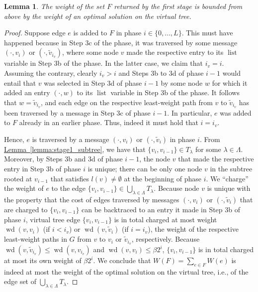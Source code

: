 \documentclass[letterpaper,11pt]{article}
\newtheorem{lemma}[theorem]{Lemma}
\newcommand{\namedref}[2]{\hyperref[#2]{#1~\ref*{#2}}}
\newcommand{\lemmaref}[1]{\namedref{Lemma}{#1}}
\newcommand{\Comp}{\lambda}
\DeclareMathOperator{\Wd}{wd}
\DeclareMathOperator{\unsent}{list}
\begin{document}
\begin{lemma}\label{lemma:stage1_approx}
The weight of the set $F$ returned by the first stage is bounded from above
by the weight of an optimal solution on the virtual tree.
\end{lemma}
\begin{proof}
Suppose edge $e$ is added to $F$ in phase $i\in \{0,\ldots,L\}$.
This must have happened because in Step 3c of the phase, it was traversed by
some message $(\cdot,v_i)$ or $(\cdot,\tilde{v}_{i_v})$, where some node $v$
made the respective entry to its $\unsent$ variable in Step 3b of the phase. In
the latter case, we claim that $i_v=i$. Assuming the contrary, clearly $i_v>i$
and Steps 3b to 3d of phase $i-1$ would entail that $v$ was selected in Step 3d
of phase $i-1$ by some node $w$ for which it added an entry $(\cdot,w)$ to its
$\unsent$ variable in Step 3b of the phase. It follows that $w=\tilde{v}_{i_v}$,
and each edge on the respective least-weight path from $v$ to $\tilde{v}_{i_v}$
has been traversed by a message in Step 3c of phase $i-1$. In particular, $e$
was added to $F$ already in an earlier phase. Thus, indeed it must hold that
$i=i_v$.

Hence, $e$ is traversed by a message $(\cdot,v_i)$ or $(\cdot,\tilde{v}_i)$
in phase $i$. From \lemmaref{lemma:stage1_subtree}, we have that
$\{v_i,v_{i-1}\}\in T_{\Comp}$ for some $\Comp\in \Lambda$. Moreover, by Steps
3b and 3d of phase $i-1$, the node $v$ that made the respective entry in Step 3b
of phase $i$ is unique; there can be only one node $v$ in the subtree rooted at
$v_{i-1}$ that satisfies $l(v)\neq \emptyset$ at the beginning of phase $i$. We
``charge'' the weight of $e$ to the edge $\{v_i,v_{i-1}\}\in \bigcup_{\Comp\in
\Lambda}T_{\Comp}$. Because node $v$ is unique with the property that the
cost of edges traversed by messages $(\cdot,v_i)$ or $(\cdot,\tilde{v}_i)$ that
are charged to $\{v_i,v_{i-1}\}$ can be backtraced to an entry it made in Step
3b of phase $i$, virtual tree edge $\{v_i,v_{i-1}\}$ is in total charged at most
weight $\Wd(v,v_i)$ (if $i<i_v$) or $\Wd(v,\tilde{v}_i)$ (if $i=i_v$), the
weight of the respective least-weight paths in $G$ from $v$ to $v_i$ or
$\tilde{v}_{i_v}$, respectively. Because $\Wd(v,\tilde{v}_{i_v})\leq
\Wd(v,v_{i_v})$ and $\Wd(v,v_i)\leq \beta 2^i$, $\{v_i,v_{i-1}\}$ is in total
charged at most its own weight of $\beta 2^i$. We conclude that $W(F)=\sum_{e\in
F}W(e)$ is indeed at most the weight of the optimal solution on the virtual
tree, i.e., of the edge set of $\bigcup_{\Comp\in \Lambda}T_{\Comp}$.
\end{proof}
\end{document}
